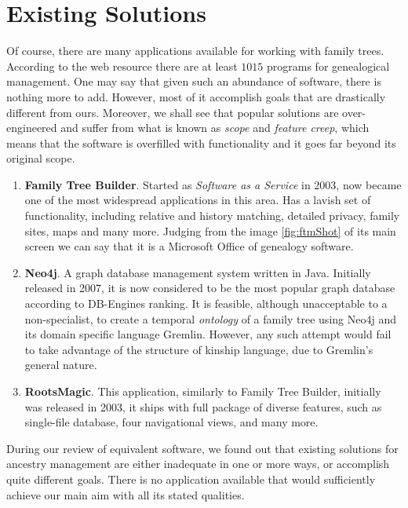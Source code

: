 \section{Existing Solutions}
    Of course, there are many applications available for working with family trees. According to the web resource\cite{gensoft} there
    are at least $1015$ programs for genealogical management. One may say that given such an abundance of software, there is
    nothing more to add. However, most of it accomplish goals that are drastically different from ours. Moreover, we shall see that
    popular solutions are over-engineered and suffer from what is known as \textit{scope} and \textit{feature creep}, which means
    that the software is overfilled with functionality and it goes far beyond its original scope.
    \begin{enumerate}
        \item{\textbf{Family Tree Builder}. Started as \textit{Software as a Service} in 2003, now became one of the most
            widespread\cite{fambuild} applications in this area. Has a lavish set of functionality, including relative and history
            matching, detailed privacy, family sites, maps and many more. Judging from the image \ref{fig:ftmShot} of its main screen
            we can say that it is a Microsoft Office of genealogy software.}
        \item{\textbf{Neo4j}. A graph database management system\cite{neo4j} written in Java. Initially released in 2007, it is now considered
            to be the most popular graph database according to DB-Engines ranking\cite{rank}. It is feasible, although unacceptable to
            a non-specialist, to create a temporal \textit{ontology} of a family tree using Neo4j and its domain specific language
            Gremlin.  However, any such attempt would fail to take advantage of the structure of kinship language, due to Gremlin's
            general nature.}
        \item{\textbf{RootsMagic}. This application\cite{roots}, similarly to Family Tree Builder, initially was released in 2003, it
            ships with full package of diverse features, such as single-file database, four navigational views, and many more.}
    \end{enumerate}
    During our review of equivalent software, we found out that existing solutions for ancestry management are either inadequate in
    one or more ways, or accomplish quite different goals. There is no application available that would sufficiently achieve our
    main aim with all its stated qualities.

